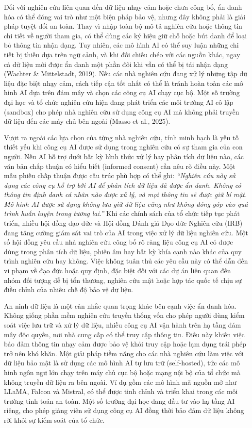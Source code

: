 Đối với nghiên cứu liên quan đến dữ liệu nhạy cảm hoặc chưa công bố, ẩn danh hóa có thể đóng vai trò như một biện pháp bảo vệ, nhưng đây không phải là giải pháp tuyệt đối an toàn. Thay vì nhập toàn bộ mô tả nghiên cứu hoặc thông tin chi tiết về người tham gia, có thể dùng các ký hiệu giữ chỗ hoặc bút danh để loại bỏ thông tin nhận dạng. Tuy nhiên, các mô hình AI có thể suy luận những chi tiết bị thiếu dựa trên ngữ cảnh, và khi đối chiếu chéo với các nguồn khác, ngay cả dữ liệu mới được ẩn danh một phần đôi khi vẫn có thể bị tái nhận dạng (Wachter \& Mittelstadt, 2019). Nếu các nhà nghiên cứu đang xử lý những tập dữ liệu đặc biệt nhạy cảm, cách tiếp cận tốt nhất có thể là tránh hoàn toàn các mô hình AI dựa trên đám mây và chọn các công cụ AI chạy cục bộ. Một số trường đại học và tổ chức nghiên cứu hiện đang phát triển các môi trường AI cô lập (sandbox) cho phép nhà nghiên cứu sử dụng công cụ AI mà không phải truyền dữ liệu đến các máy chủ bên ngoài (Masso et al., 2025).

Vượt ra ngoài các lựa chọn của từng nhà nghiên cứu, tính minh bạch là yếu tố thiết yếu khi công cụ AI được sử dụng trong nghiên cứu có sự tham gia của con người. Nếu AI hỗ trợ dưới bất kỳ hình thức xử lý hay phân tích dữ liệu nào, các văn bản chấp thuận có hiểu biết (informed consent) cần nêu rõ điều này. Một mẫu phiếu chấp thuận được cấu trúc phù hợp có thể ghi: \emph{``Nghiên cứu này sử dụng các công cụ hỗ trợ bởi AI để phân tích dữ liệu đã được ẩn danh. Không có thông tin định danh cá nhân nào được xử lý, và mọi thông tin sẽ được giữ bí mật. Mô hình AI được sử dụng không lưu giữ dữ liệu cũng như không đóng góp vào quá trình huấn luyện trong tương lai.''} Khi các chính sách của tổ chức tiếp tục phát triển, nhiều hội đồng đạo đức và Hội đồng Đánh giá Đạo đức Nghiên cứu (IRB) đang tăng cường giám sát vai trò của AI trong việc xử lý dữ liệu nghiên cứu. Một số hội đồng yêu cầu nhà nghiên cứu công bố rõ ràng liệu công cụ AI có được dùng trong phân tích dữ liệu, phiên âm hay bất kỳ khía cạnh nào khác của quy trình nghiên cứu hay không. Việc không tuân thủ các yêu cầu này có thể dẫn đến vi phạm về đạo đức hoặc quy định, đặc biệt đối với các dự án liên quan đến nhóm đối tượng dễ bị tổn thương, nghiên cứu mật hoặc hợp tác quốc tế chịu sự điều chỉnh của nhiều chế độ bảo vệ dữ liệu.

An ninh dữ liệu là một cân nhắc quan trọng khác bên cạnh việc ẩn danh hóa. Không giống phần mềm nghiên cứu truyền thống vốn cho phép người dùng kiểm soát việc lưu trữ và xử lý dữ liệu, nhiều công cụ AI vận hành trên hạ tầng đám mây độc quyền, nơi nhà cung cấp có thể truy cập thông tin. Điều này khiến việc bảo đảm thông tin nhạy cảm được bảo vệ khỏi truy cập hoặc lạm dụng trái phép trở nên khó khăn. Một giải pháp tiềm năng cho các nhà nghiên cứu làm việc với dữ liệu bảo mật là sử dụng các mô hình AI tự lưu trữ (self-hosted), tức các mô hình ngôn ngữ lớn chạy trên máy chủ cục bộ hoặc mạng nội bộ của tổ chức mà không truyền dữ liệu ra bên ngoài. Ví dụ gồm các mô hình mã nguồn mở như LLaMA, Falcon và Mistral, có thể được tinh chỉnh và triển khai trong các môi trường tính toán an toàn. Một số trường đại học đang đầu tư vào hạ tầng AI riêng, cho phép giảng viên sử dụng công cụ AI đồng thời bảo đảm dữ liệu không rời khỏi sự kiểm soát của tổ chức.

